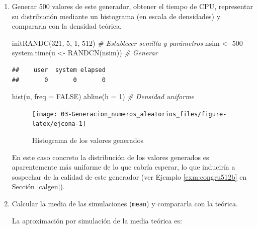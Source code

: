 \documentclass[
]{book}
\newenvironment{Shaded}{\begin{snugshade}}{\end{snugshade}}
\newcommand{\AttributeTok}[1]{\textcolor[rgb]{0.77,0.63,0.00}{#1}}
\newcommand{\CommentTok}[1]{\textcolor[rgb]{0.56,0.35,0.01}{\textit{#1}}}
\newcommand{\ConstantTok}[1]{\textcolor[rgb]{0.00,0.00,0.00}{#1}}
\newcommand{\DecValTok}[1]{\textcolor[rgb]{0.00,0.00,0.81}{#1}}
\newcommand{\FunctionTok}[1]{\textcolor[rgb]{0.00,0.00,0.00}{#1}}
\newcommand{\NormalTok}[1]{#1}
\newcommand{\OtherTok}[1]{\textcolor[rgb]{0.56,0.35,0.01}{#1}}
\theoremstyle{break}
\theoremstyle{definition}
\theoremstyle{definition}
\theoremstyle{definition}
\theoremstyle{definition}
\theoremstyle{remark}
\begin{document}
\begin{enumerate}
\def\labelenumi{\alph{enumi})}
\item
  Generar 500 valores de este generador, obtener el tiempo de CPU,
  representar su distribución mediante un histograma (en escala
  de densidades) y compararla con la densidad teórica.

\begin{Shaded}
\begin{Highlighting}[]
\FunctionTok{initRANDC}\NormalTok{(}\DecValTok{321}\NormalTok{, }\DecValTok{5}\NormalTok{, }\DecValTok{1}\NormalTok{, }\DecValTok{512}\NormalTok{)       }\CommentTok{\# Establecer semilla y parámetros}
\NormalTok{nsim }\OtherTok{\textless{}{-}} \DecValTok{500}
\FunctionTok{system.time}\NormalTok{(u }\OtherTok{\textless{}{-}} \FunctionTok{RANDCN}\NormalTok{(nsim))  }\CommentTok{\# Generar}
\end{Highlighting}
\end{Shaded}

\begin{verbatim}
##    user  system elapsed 
##       0       0       0
\end{verbatim}

\begin{Shaded}
\begin{Highlighting}[]
\FunctionTok{hist}\NormalTok{(u, }\AttributeTok{freq =} \ConstantTok{FALSE}\NormalTok{)}
\FunctionTok{abline}\NormalTok{(}\AttributeTok{h =} \DecValTok{1}\NormalTok{)                   }\CommentTok{\# Densidad uniforme}
\end{Highlighting}
\end{Shaded}

  \begin{figure}[!htb]

  {\centering \texttt{[image: 03-Generacion\_numeros\_aleatorios\_files/figure-latex/ejcona-1]} 

  }

  \caption{Histograma de los valores generados}\label{fig:ejcona}
  \end{figure}

  En este caso concreto la distribución de los valores generados es aparentemente más uniforme de lo que cabría esperar, lo que induciría a sospechar de la calidad de este generador (ver Ejemplo \ref{exm:congru512b} en Sección \ref{calgen}).
\item
  Calcular la media de las simulaciones (\texttt{mean}) y compararla con
  la teórica.

  La aproximación por simulación de la media teórica es:


\end{enumerate}
\end{document}
